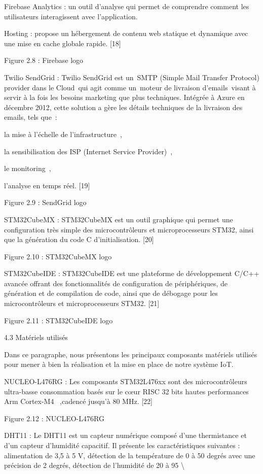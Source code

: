 \documentclass{article}
\begin{document}
Firebase Analytics : un outil d’analyse qui permet de comprendre comment les utilisateurs interagissent avec l’application.

Hosting : propose un hébergement de contenu web statique et dynamique avec une mise en cache globale rapide. [18]

Figure 2.8 : Firebase logo

Twilio SendGrid : Twilio SendGrid est un SMTP (Simple Mail Transfer Protocol) provider dans le Cloud qui agit comme un moteur de livraison d’emails visant à servir à la fois les besoins marketing que plus techniques. Intégrée à Azure en décembre 2012, cette solution a gère les détails techniques de la livraison des emails, tels que :

la mise à l’échelle de l’infrastructure ,

la sensibilisation des ISP (Internet Service Provider) ,

le monitoring ,

l’analyse en temps réel. [19]

Figure 2.9 : SendGrid logo

STM32CubeMX : STM32CubeMX est un outil graphique qui permet une configuration très simple des microcontrôleurs et microprocesseurs STM32, ainsi que la génération du code C d'initialisation. [20]

Figure 2.10 : STM32CubeMX logo

STM32CubeIDE : STM32CubeIDE  est une plateforme de développement C/C++ avancée offrant des fonctionnalités de configuration de périphériques, de génération et de compilation de code, ainsi que de débogage pour les microcontrôleurs et microprocesseurs STM32. [21]

Figure 2.11 : STM32CubeIDE logo

4.3 Matériels utilisés

Dans ce paragraphe, nous présentons les principaux composants matériels utilisés pour mener à bien la réalisation et la mise en place de notre système IoT.

NUCLEO-L476RG : Les composants STM32L476xx sont des microcontrôleurs ultra-basse consommation basés sur le cœur RISC 32 bits hautes performances Arm Cortex-M4  ,cadencé jusqu'à 80 MHz. [22]

Figure 2.12 : NUCLEO-L476RG 

DHT11 : Le DHT11 est un capteur numérique composé d’une thermistance et d’un capteur d’humidité capacitif. Il présente les caractéristiques suivantes : alimentation de 3,5 à 5 V, détection de la température de 0 à 50 degrés avec une précision de 2 degrés, détection de l’humidité de 20 à 95 \textbackslash{}%
\end{document}
